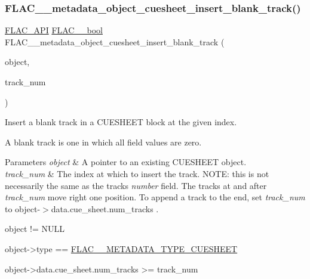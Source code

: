 \subsubsection{\texorpdfstring{F\+L\+A\+C\+\_\+\+\_\+metadata\+\_\+object\+\_\+cuesheet\+\_\+insert\+\_\+blank\+\_\+track()}{FLAC\_\_metadata\_object\_cuesheet\_insert\_blank\_track()}}
{\footnotesize\ttfamily \hyperlink{group__flac__export_ga56ca07df8a23310707732b1c0007d6f5}{F\+L\+A\+C\+\_\+\+A\+PI} \hyperlink{ordinals_8h_a95103469f1cbd78b8cf250194985b34e}{F\+L\+A\+C\+\_\+\+\_\+bool} F\+L\+A\+C\+\_\+\+\_\+metadata\+\_\+object\+\_\+cuesheet\+\_\+insert\+\_\+blank\+\_\+track (\begin{DoxyParamCaption}\item[{\hyperlink{struct_f_l_a_c_____stream_metadata}{F\+L\+A\+C\+\_\+\+\_\+\+Stream\+Metadata} $\ast$}]{object,  }\item[{unsigned}]{track\+\_\+num }\end{DoxyParamCaption})}

Insert a blank track in a C\+U\+E\+S\+H\+E\+ET block at the given index.

A blank track is one in which all field values are zero.


\begin{DoxyParams}{Parameters}
{\em object} & A pointer to an existing C\+U\+E\+S\+H\+E\+ET object. \\
\hline
{\em track\+\_\+num} & The index at which to insert the track. N\+O\+TE\+: this is not necessarily the same as the track\textquotesingle{}s {\itshape number} field. The tracks at and after {\itshape track\+\_\+num} move right one position. To append a track to the end, set {\itshape track\+\_\+num} to {\ttfamily object-\/$>$data.\+cue\+\_\+sheet.\+num\+\_\+tracks} .  
\begin{DoxyCode}
\textcolor{keywordtype}{object} != NULL 
\end{DoxyCode}
 
\begin{DoxyCode}
\textcolor{keywordtype}{object}->type == \hyperlink{group__flac__format_ggac71714ba8ddbbd66d26bb78a427fac01a0b3f07ae60609126562cd0233ce00a65}{FLAC\_\_METADATA\_TYPE\_CUESHEET} 
\end{DoxyCode}
 
\begin{DoxyCode}
\textcolor{keywordtype}{object}->data.cue\_sheet.num\_tracks >= track\_num 
\end{DoxyCode}
 \\
\hline
\end{DoxyParams}

